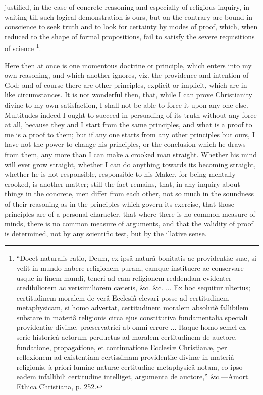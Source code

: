 justified, in the case of concrete reasoning and especially of
religious inquiry, in waiting till such logical demonstration is ours,
but on the contrary are bound in conscience to seek truth and to look
for certainty by modes of proof, which, when reduced to the shape of
formal propositions, fail to satisfy the severe requisitions of
science \footnote{``Docet
naturalis ratio, Deum, ex ipsâ naturâ bonitatis ac providentiæ suæ,
si velit in mundo habere religionem puram, eamque instituere ac
conservare usque in finem mundi, teneri ad eam religionem reddendam
evidenter credibiliorem ac verisimiliorem cæteris, \&c. \&c.
... Ex hoc sequitur ulterius; certitudinem moralem de verâ Ecclesiâ
elevari posse ad certitudinem metaphysicam, si homo advertat,
certitudinem moralem absolutè fallibilem substare in materiâ
religionis circa ejus constitutiva fundamentalia speciali providentiæ
divinæ, præservatrici ab omni errore ... Itaque homo semel ex serie
historicâ actorum perductus ad moralem certitudinem de auctore,
fundatione, propagatione, et continuatione Ecclesiæ Christianæ, per
reflexionem ad existentiam certissimam providentiæ divinæ in
materiâ religionis, à priori lumine naturæ certitudine metaphysicâ
notam, eo ipso eadem infallibili certitudine intelliget, argumenta de
auctore,'' \&c.—Amort. Ethica Christiana, p. 252.}.

Here then at once is one momentous doctrine or principle, which
enters into my own reasoning, and which another ignores, viz. the
providence and intention of God; and of course there are other
principles, explicit or implicit, which are in like circumstances. It
is not wonderful then, that, while I can prove Christianity divine to my own satisfaction, I shall not be able to force it upon
any one else. Multitudes indeed I ought to succeed in persuading of
its truth without any force at all, because they and I start from the
same principles, and what is a proof to me is a proof to them; but if
any one starts from any other principles but ours, I have not the
power to change his principles, or the conclusion which he draws from
them, any more than I can make a crooked man straight. Whether his
mind will ever grow straight, whether I can do anything towards its
becoming straight, whether he is not responsible, responsible to his
Maker, for being mentally crooked, is another matter; still the fact
remains, that, in any inquiry about things in the concrete, men differ
from each other, not so much in the soundness of their reasoning as in
the principles which govern its exercise, that those principles are of
a personal character, that where there is no common measure of minds,
there is no common measure of arguments, and that the validity of
proof is determined, not by any scientific test, but by the illative
sense.

